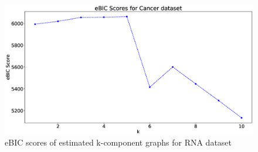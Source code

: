 \begin{center}
	\begin{figure}[htpb]
		\includegraphics[scale=0.3]{Pictures/cancer}
		\caption{eBIC scores of estimated k-component graphs for RNA dataset}
		\label{fig:gms-cancer}
	\end{figure}
\end{center}



